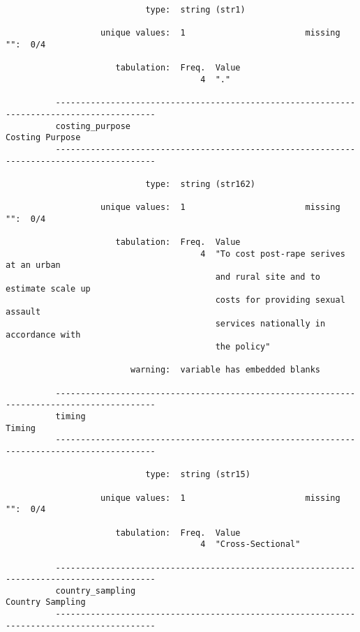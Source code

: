 \documentclass{article}
\begin{document}
\begin{verbatim}
                            type:  string (str1)
          
                   unique values:  1                        missing "":  0/4
          
                      tabulation:  Freq.  Value
                                       4  "."
          
          ------------------------------------------------------------------------------------------
          costing_purpose                                                            Costing Purpose
          ------------------------------------------------------------------------------------------
          
                            type:  string (str162)
          
                   unique values:  1                        missing "":  0/4
          
                      tabulation:  Freq.  Value
                                       4  "To cost post-rape serives at an urban
                                          and rural site and to estimate scale up
                                          costs for providing sexual assault
                                          services nationally in accordance with
                                          the policy"
          
                         warning:  variable has embedded blanks
          
          ------------------------------------------------------------------------------------------
          timing                                                                              Timing
          ------------------------------------------------------------------------------------------
          
                            type:  string (str15)
          
                   unique values:  1                        missing "":  0/4
          
                      tabulation:  Freq.  Value
                                       4  "Cross-Sectional"
          
          ------------------------------------------------------------------------------------------
          country_sampling                                                          Country Sampling
          ------------------------------------------------------------------------------------------
          

\end{verbatim}
\end{document}
